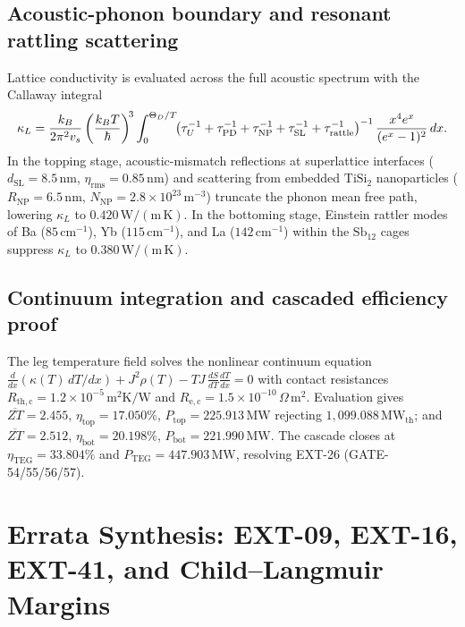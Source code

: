 \subsection*{Acoustic-phonon boundary and resonant rattling scattering}
Lattice conductivity is evaluated across the full acoustic spectrum with
the Callaway integral
\[
\resizebox{0.99\columnwidth}{!}{$\displaystyle
\kappa_L = \frac{k_B}{2\pi^2 v_s}\left(\frac{k_B T}{\hbar}\right)^{\!3}
\int_0^{\Theta_D/T}\!\!
\left(\tau_U^{-1}+\tau_{\mathrm{PD}}^{-1}+\tau_{\mathrm{NP}}^{-1}
+\tau_{\mathrm{SL}}^{-1}+\tau_{\mathrm{rattle}}^{-1}\right)^{-1}
\frac{x^4 e^x}{(e^x-1)^2}\,dx$}.
\]
In the topping stage, acoustic-mismatch reflections at superlattice
interfaces ($d_{\mathrm{SL}} = 8.5\,\mathrm{nm}$,
$\eta_{\mathrm{rms}} = 0.85\,\mathrm{nm}$) and scattering from embedded
$\mathrm{TiSi}_2$ nanoparticles ($R_{\mathrm{NP}} = 6.5\,\mathrm{nm}$,
$N_{\mathrm{NP}} = 2.8\times10^{23}\,\mathrm{m^{-3}}$) truncate the
phonon mean free path, lowering $\kappa_L$ to $0.420\,\mathrm{W/(m\,K)}$.
In the bottoming stage, Einstein rattler modes of Ba ($85\,
\mathrm{cm^{-1}}$), Yb ($115\,\mathrm{cm^{-1}}$), and La ($142\,
\mathrm{cm^{-1}}$) within the $\mathrm{Sb}_{12}$ cages suppress
$\kappa_L$ to $0.380\,\mathrm{W/(m\,K)}$.

\subsection*{Continuum integration and cascaded efficiency proof}
The leg temperature field solves the nonlinear continuum equation
$\frac{d}{dx}(\kappa(T)\,dT/dx) + J^2\rho(T) - TJ\,\frac{dS}{dT}
\frac{dT}{dx} = 0$ with contact resistances $R_{\mathrm{th,c}} =
1.2\times10^{-5}\,\mathrm{m^2K/W}$ and $R_{\mathrm{e,c}} =
1.5\times10^{-10}\,\Omega\,\mathrm{m^2}$. Evaluation gives
$\overline{ZT} = 2.455$, $\eta_{\mathrm{top}} = 17.050\%$,
$P_{\mathrm{top}} = 225.913\,\mathrm{MW}$ rejecting $1{,}099.088\,
\mathrm{MW_{th}}$; and $\overline{ZT} = 2.512$,
$\eta_{\mathrm{bot}} = 20.198\%$, $P_{\mathrm{bot}} = 221.990\,
\mathrm{MW}$. The cascade closes at
$\eta_{\mathrm{TEG}} = 33.804\%$ and $P_{\mathrm{TEG}} = 447.903\,
\mathrm{MW}$, resolving EXT-26 (GATE-54/55/56/57).

\section{Errata Synthesis: EXT-09, EXT-16, EXT-41, and Child--Langmuir
Margins}
\label{app:errata}

